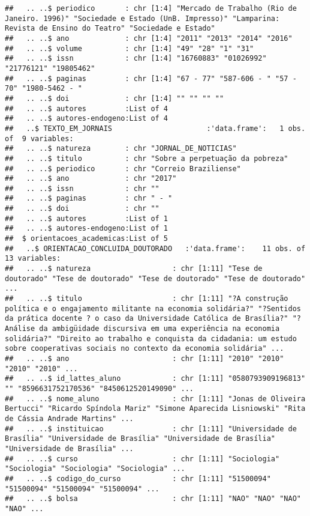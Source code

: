 \documentclass[]{article}
\begin{document}
\begin{verbatim}
##   .. ..$ periodico       : chr [1:4] "Mercado de Trabalho (Rio de Janeiro. 1996)" "Sociedade e Estado (UnB. Impresso)" "Lamparina: Revista de Ensino do Teatro" "Sociedade e Estado"
##   .. ..$ ano             : chr [1:4] "2011" "2013" "2014" "2016"
##   .. ..$ volume          : chr [1:4] "49" "28" "1" "31"
##   .. ..$ issn            : chr [1:4] "16760883" "01026992" "21776121" "19805462"
##   .. ..$ paginas         : chr [1:4] "67 - 77" "587-606 - " "57 - 70" "1980-5462 - "
##   .. ..$ doi             : chr [1:4] "" "" "" ""
##   .. ..$ autores         :List of 4
##   .. ..$ autores-endogeno:List of 4
##   ..$ TEXTO_EM_JORNAIS                      :'data.frame':   1 obs. of  9 variables:
##   .. ..$ natureza        : chr "JORNAL_DE_NOTICIAS"
##   .. ..$ titulo          : chr "Sobre a perpetuação da pobreza"
##   .. ..$ periodico       : chr "Correio Braziliense"
##   .. ..$ ano             : chr "2017"
##   .. ..$ issn            : chr ""
##   .. ..$ paginas         : chr " - "
##   .. ..$ doi             : chr ""
##   .. ..$ autores         :List of 1
##   .. ..$ autores-endogeno:List of 1
##  $ orientacoes_academicas:List of 5
##   ..$ ORIENTACAO_CONCLUIDA_DOUTORADO   :'data.frame':    11 obs. of  13 variables:
##   .. ..$ natureza                   : chr [1:11] "Tese de doutorado" "Tese de doutorado" "Tese de doutorado" "Tese de doutorado" ...
##   .. ..$ titulo                     : chr [1:11] "?A construção política e o engajamento militante na economia solidária?" "?Sentidos da prática docente ? o caso da Universidade Católica de Brasília?" "?Análise da ambigüidade discursiva em uma experiência na economia solidária?" "Direito ao trabalho e conquista da cidadania: um estudo sobre cooperativas sociais no contexto da economia solidária" ...
##   .. ..$ ano                        : chr [1:11] "2010" "2010" "2010" "2010" ...
##   .. ..$ id_lattes_aluno            : chr [1:11] "0580793909196813" "" "8596631752170536" "8450612520149090" ...
##   .. ..$ nome_aluno                 : chr [1:11] "Jonas de Oliveira Bertucci" "Ricardo Spíndola Mariz" "Simone Aparecida Lisniowski" "Rita de Cássia Andrade Martins" ...
##   .. ..$ instituicao                : chr [1:11] "Universidade de Brasília" "Universidade de Brasília" "Universidade de Brasília" "Universidade de Brasília" ...
##   .. ..$ curso                      : chr [1:11] "Sociologia" "Sociologia" "Sociologia" "Sociologia" ...
##   .. ..$ codigo_do_curso            : chr [1:11] "51500094" "51500094" "51500094" "51500094" ...
##   .. ..$ bolsa                      : chr [1:11] "NAO" "NAO" "NAO" "NAO" ...

\end{verbatim}
\end{document}
